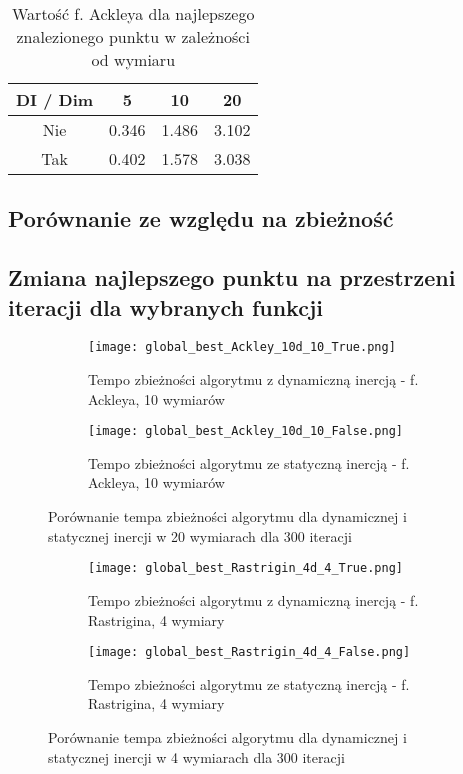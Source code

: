 \documentclass[12pt]{article}
\begin{document}
\begin{table}[h!]
	\centering
	\begin{tabular}{|c|c|c|c|}
		\hline
		DI / Dim & 5     & 10    & 20    \\
		\hline
		Nie      & 0.346 & 1.486 & 3.102 \\
		Tak      & 0.402 & 1.578 & 3.038 \\
		\hline
	\end{tabular}
	\caption{Wartość f. Ackleya dla najlepszego znalezionego punktu w zależności od wymiaru}
	\label{tab:ackley_values}
\end{table}

\subsection*{Porównanie ze względu na zbieżność}

\subsection*{Zmiana najlepszego punktu na przestrzeni iteracji dla wybranych funkcji}

\begin{figure}[h!]
	\centering
	\begin{subfigure}{0.49\textwidth}
		\texttt{[image: global\_best\_Ackley\_10d\_10\_True.png]}
		\caption{Tempo zbieżności algorytmu z dynamiczną inercją - f. Ackleya, 10 wymiarów}
	\end{subfigure}
	\hfill
	\begin{subfigure}{0.49\textwidth}
		\texttt{[image: global\_best\_Ackley\_10d\_10\_False.png]}
		\caption{Tempo zbieżności algorytmu ze statyczną inercją - f. Ackleya, 10 wymiarów}
	\end{subfigure}
	\caption{Porównanie tempa zbieżności algorytmu dla dynamicznej i statycznej inercji w 20 wymiarach dla 300 iteracji}
	\label{20d_comp}
\end{figure}


\begin{figure}[h!]
	\centering
	\begin{subfigure}{0.49\textwidth}
		\texttt{[image: global\_best\_Rastrigin\_4d\_4\_True.png]}
		\caption{Tempo zbieżności algorytmu z dynamiczną inercją - f. Rastrigina, 4 wymiary}
	\end{subfigure}
	\hfill
	\begin{subfigure}{0.49\textwidth}
		\texttt{[image: global\_best\_Rastrigin\_4d\_4\_False.png]}
		\caption{Tempo zbieżności algorytmu ze statyczną inercją - f. Rastrigina, 4 wymiary}
	\end{subfigure}
	\caption{Porównanie tempa zbieżności algorytmu dla dynamicznej i statycznej inercji w 4 wymiarach dla 300 iteracji}
	\label{4d_comp}
\end{figure}
\end{document}
